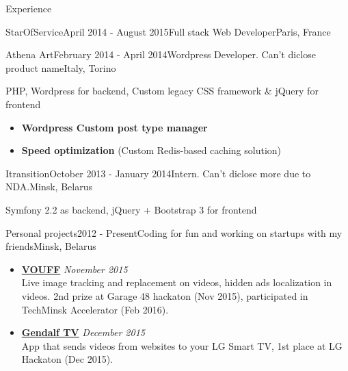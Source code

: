 \documentclass{resume} %
\begin{document}
\begin{rSection}{Experience}
\begin{rSubsection}{StarOfService}{April 2014 - August 2015}{Full stack Web Developer}{Paris, France}
\end{rSubsection}


\begin{rSubsection}{Athena Art}{February 2014 - April 2014}{Wordpress Developer. Can't diclose product name}{Italy, Torino}
\item PHP, Wordpress for backend, Custom legacy CSS framework \& jQuery for frontend


\begin{itemize}[leftmargin=*,label={$+$}]
  \item {\bf Wordpress Custom post type manager}
  \item {\bf Speed optimization} (Custom Redis-based caching solution)
\end{itemize}

\end{rSubsection}
\clearpage


\begin{rSubsection}{Itransition}{October 2013 - January 2014}{Intern. Can't diclose more due to NDA.}{Minsk, Belarus}
\item Symfony 2.2 as backend, jQuery + Bootstrap 3 for frontend
\end{rSubsection}


\begin{rSubsection}{Personal projects}{2012 - Present}{Coding for fun and working on startups with my friends}{Minsk, Belarus}

\begin{itemize}[leftmargin=*,label={$+$}]
  \item {\bf \href{http://nagibator.xyz}{VOUFF}} \hfill {\em November 2015}  \\
	Live image tracking and replacement on videos, hidden ads localization in videos. 2nd prize at Garage
	48 hackaton (Nov 2015), participated in TechMinsk Accelerator (Feb 2016).

  \item {\bf \href{http://gendalf.tv}{Gendalf TV}} \hfill {\em December 2015}  \\
	App that sends videos from websites to your LG Smart TV, 1st place at LG Hackaton (Dec 2015).


\end{itemize}
\end{rSubsection}
\end{rSection}
\end{document}
